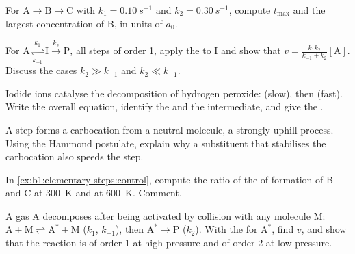 \begin{exercise}[$\star\star$]\label{exo:b1:elementary-steps:5}
For $\mathrm{A} \to \mathrm{B} \to \mathrm{C}$ with $k_1 =
\qty{0.10}{s^{-1}}$ and $k_2 = \qty{0.30}{s^{-1}}$, compute $t_{\max}$ and
the largest concentration of $\mathrm{B}$, in units of $a_0$.
\end{exercise}

\begin{exercise}[$\star\star$]\label{exo:b1:elementary-steps:6}
For $\mathrm{A} \underset{k_{-1}}{\overset{k_1}{\rightleftharpoons}}
\mathrm{I} \xrightarrow{k_2} \mathrm{P}$, all steps of order 1, apply the
 to $\mathrm{I}$ and show that $v =
\frac{k_1k_2}{k_{-1} + k_2}[\mathrm{A}]$. Discuss the cases $k_2 \gg
k_{-1}$ and $k_2 \ll k_{-1}$.
\end{exercise}

\begin{exercise}[$\star\star$]\label{exo:b1:elementary-steps:7}
Iodide ions catalyse the decomposition of hydrogen peroxide:
 (slow), then 
(fast). Write the overall equation, identify the  and the
intermediate, and give the .
\end{exercise}

\begin{exercise}[$\star\star$]\label{exo:b1:elementary-steps:8}
A step forms a carbocation from a neutral molecule, a strongly uphill
process. Using the Hammond postulate, explain why a substituent that
stabilises the carbocation also speeds the step.
\end{exercise}

\begin{exercise}[$\star\star$]\label{exo:b1:elementary-steps:9}
In \cref{ex:b1:elementary-steps:control}, compute the ratio of the  of formation of B and C at \qty{300}{K} and at \qty{600}{K}.
Comment.
\end{exercise}

\begin{exercise}[$\star\star\star$]\label{exo:b1:elementary-steps:10}
A gas $\mathrm{A}$ decomposes after being activated by collision with any
molecule $\mathrm{M}$: $\mathrm{A} + \mathrm{M} \rightleftharpoons
\mathrm{A}^* + \mathrm{M}$ ($k_1$, $k_{-1}$), then $\mathrm{A}^* \to
\mathrm{P}$ ($k_2$). With the  for
$\mathrm{A}^*$, find $v$, and show that the reaction is of order 1 at high
pressure and of order 2 at low pressure.
\end{exercise}

